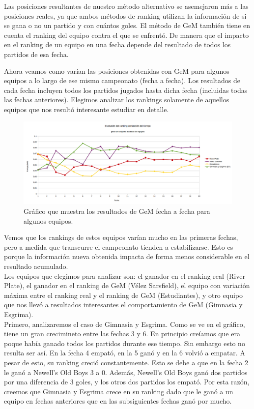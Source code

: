 Las posiciones resultantes de nuestro método alternativo se asemejaron más a las posiciones reales, ya que ambos métodos de ranking utilizan la información de si se gana o no un partido y con cuántos goles. El método de GeM también tiene en cuenta el ranking del equipo contra el que se enfrentó. De manera que el impacto en el ranking de un equipo en una fecha depende del resultado de todos los partidos de esa fecha.


Ahora veamos como varían las posiciones obtenidas con GeM para algunos equipos a lo largo de ese mismo campeonato (fecha a fecha). Los resultados de cada fecha incluyen todos los partidos jugados hasta dicha fecha (incluidas todas las fechas anteriores).
Elegimos analizar los rankings solamente de aquellos equipos que nos resultó interesante estudiar en detalle.

\begin{figure}[H]
  \includegraphics[scale=0.449]{imagenes/gemfechas2.png}
   \caption{Gráfico que muestra los resultados de GeM fecha a fecha para algunos equipos.}
  \label{fig:img1}
\end{figure}

Vemos que los rankings de estos equipos varían mucho en las primeras fechas, pero a medida que transcurre el campeonato tienden a estabilizarse. Esto es porque la información nueva obtenida impacta de forma menos considerable en el resultado acumulado.\\

Los equipos que elegimos para analizar son: el ganador en el ranking real (River Plate), el ganador en el ranking de GeM (Vélez Sarsfield), el equipo con variación máxima entre el ranking real y el ranking de GeM (Estudiantes), y otro equipo que nos llevó a resultados interesantes el comportamiento de GeM (Gimnasia y Esgrima).\\

Primero, analizaremos el caso de Gimnasia y Esgrima. Como se ve en el gráfico, tiene un gran crecimineto entre las fechas 3 y 6. En principio creíamos que era poque había ganado todos los partidos durante ese tiempo. Sin embargo esto no resulta ser así. En la fecha 4 empató, en la 5 ganó y en la 6 volvió a empatar. A pesar de esto, su ranking creció constantemente. Esto se debe a que en la fecha 2 le ganó a Newell's Old Boys 3 a 0. Además, Newell's Old Boys ganó dos partidos por una diferencia de 3 goles, y los otros dos partidos los empató. Por esta razón, creemos que Gimnasia y Esgrima crece en su ranking dado que le ganó a un equipo en fechas anteriores que en las subsiguientes fechas ganó por mucho. \\

